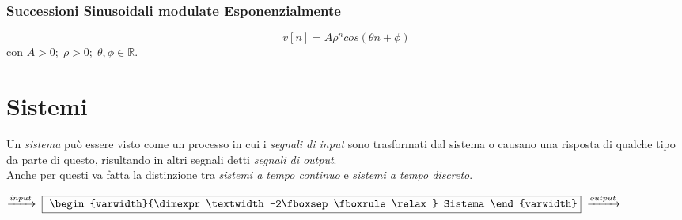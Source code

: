 \documentclass{article}
\begin{document}
			\subsubsection{Successioni Sinusoidali modulate Esponenzialmente}
				\[
					v[n]=A\rho^{n}cos(\theta n + \phi)
				\]
				con $ A>0;\; \rho>0;\; \theta, \phi \in \mathbb{R} $.

	\newpage

	\section{Sistemi}
		Un \textit{sistema} può essere visto come un processo in cui i \textit{segnali di input} sono trasformati dal sistema o causano una risposta di qualche tipo da parte di questo, risultando in altri segnali detti \textit{segnali di output}. \\
		Anche per questi va fatta la distinzione tra \textit{sistemi a tempo continuo} e \textit{sistemi a tempo discreto}.

		\begin{center}
			$ \xrightarrow{input}\; \fbox{
				\begin{varwidth}{\dimexpr\textwidth-2\fboxsep\fboxrule\relax} Sistema \end{varwidth}}
				\; \xrightarrow{output} $
		\end{center}
\end{document}
